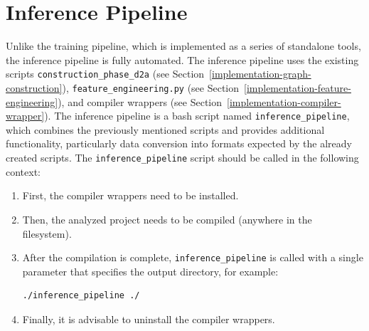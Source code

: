 \section{Inference Pipeline}
\label{implementation-inference-pipeline}
Unlike the training pipeline, which is implemented as a series of standalone tools, the inference pipeline is fully automated. The inference pipeline uses the existing scripts \texttt{construction\_phase\_d2a} (see Section~\ref{implementation-graph-construction}), \texttt{feature\_engineering.py} (see Section~\ref{implementation-feature-engineering}), and compiler wrappers (see Section~\ref{implementation-compiler-wrapper}). The inference pipeline is a bash script named \texttt{inference\_pipeline}, which combines the previously mentioned scripts and provides additional functionality, particularly data conversion into formats expected by the already created scripts. The \texttt{inference\_pipeline} script should be called in the following context:
\begin{enumerate}
    \item First, the compiler wrappers need to be installed.
    \item Then, the analyzed project needs to be compiled (anywhere in the filesystem).
    \item After the compilation is complete, \texttt{inference\_pipeline} is called with a single parameter that specifies the output directory, for example:
\begin{lstlisting}[language=bash, xleftmargin=2em]
./inference_pipeline ./
\end{lstlisting} 
    \item Finally, it is advisable to uninstall the compiler wrappers.
\end{enumerate}

